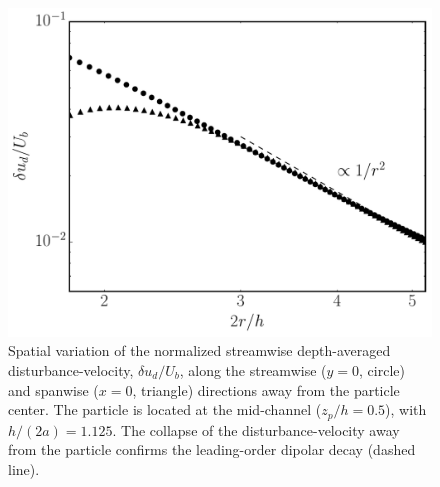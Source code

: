 \begin{figure}[t!]
 \begin{center}
 \includegraphics[width=.7\columnwidth]{decay.pdf}
 \end{center}
 \caption{Spatial variation of the normalized streamwise depth-averaged disturbance-velocity, $\delta u_d/U_b$, along the streamwise ($y=0$, circle) and spanwise ($x=0$, triangle) directions away from the particle center. The particle is located at the mid-channel ($z_p/h=0.5$), with $h/(2a)=1.125$.
 The collapse of the disturbance-velocity away from the particle confirms the leading-order dipolar decay (dashed line).}
 \label{fig: decay}
\end{figure}




